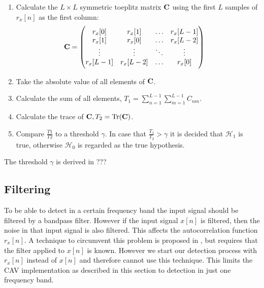 \documentclass[a4paper, openany, oneside]{memoir}
\begin{document}
\begin{enumerate}
	\item Calculate the $L\times L$ symmetric toeplitz matrix $\boldsymbol{\mathbf{C}}$ using the first $L$ samples of $r_x[n]$ as the first column:
	\begin{align}
		\boldsymbol{\mathbf{C}} &= \begin{pmatrix}
		r_x[0] & r_x[1] & \ldots & r_x[L-1] \\
		r_x[1] & r_x[0] & \ldots & r_x[L-2] \\
		\vdots & \vdots & \ddots & \vdots \\
		r_x[L-1] & r_x[L-2] & \ldots & r_x[0]
		\end{pmatrix}
	\end{align}
	\item Take the absolute value of all elements of $\boldsymbol{\mathbf{C}}$.
	\item Calculate the sum of all elements, $T_1 = \sum_{n=1}^{L-1}\sum_{m=1}^{L-1} C_{nm}$.
	\item Calculate the trace of $\boldsymbol{\mathbf{C}}, T_2 = \text{Tr}(\boldsymbol{\mathbf{C}})$.
	\item Compare $\frac{T1}{T2}$ to a threshold $\gamma$. In case that $\frac{T_1}{T_2} > \gamma$ it is decided that $\mathcal{H}_1$ is true, otherwise $\mathcal{H}_0$ is regarded as the true hypothesis. 
\end{enumerate}

The threshold $\gamma$ is derived in ???

\subsection{Filtering}
To be able to detect in a certain frequency band the input signal should be filtered by a bandpass filter. However if the input signal $x[n]$ is filtered, then the noise in that input signal is also filtered. This affects the autocorrelation function $r_x[n]$.  A technique to circumvent this problem is proposed in \cite{zheng2009spectrum}, but requires that the filter applied to $x[n]$ is known. However we start our detection process with $r_x[n]$ instead of $x[n]$ and therefore cannot use this technique. This limits the CAV implementation as described in this section to detection in just one frequency band.


\end{document}
